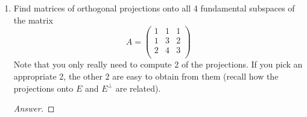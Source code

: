 \documentclass[../psets.tex]{subfiles}
\begin{document}
\begin{enumerate}[label={\textbf{5.\arabic*.}}]
    \item Find matrices of orthogonal projections onto all 4 fundamental subspaces of the matrix
    \begin{equation*}
        A =
        \begin{pmatrix}
            1 & 1 & 1\\
            1 & 3 & 2\\
            2 & 4 & 3\\
        \end{pmatrix}
    \end{equation*}
    Note that you only really need to compute 2 of the projections. If you pick an appropriate 2, the other 2 are easy to obtain from them (recall how the projections onto $E$ and $E^\perp$ are related).
    \begin{proof}[Answer]



\end{proof}
\end{enumerate}
\end{document}
